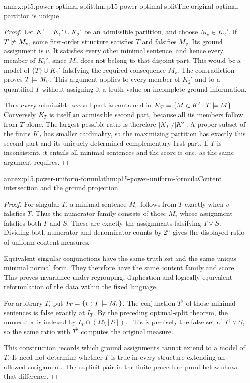 \begin{annexitem}{annex:p15.power-optimal-split}{thm:p15-power-optimal-split}{The original optimal partition is unique}
\begin{proof}
Let \(K'=K_1'\mathbin{\dot\cup}K_2'\)
be an admissible partition, and choose
\(M_v\in K_2'\).
If \(T\not\models M_v\), some
first-order structure satisfies
\(T\) and falsifies \(M_v\).
Its ground assignment is \(v\).
It satisfies every other minimal
sentence, and hence every member
of \(K_1'\), since \(M_v\) does
not belong to that disjoint part.
This would be a model of
\(\{T\}\cup K_1'\) falsifying the
required consequence \(M_v\).
The contradiction proves
\(T\models M_v\).
This argument applies to every
member of \(K_2'\) and to a
quantified \(T\) without assigning
it a truth value on incomplete
ground information.

Thus every admissible second
part is contained in
\(K_T=\{M\in K':T\models M\}\).
Conversely \(K_T\) is itself
an admissible second part,
because all its members follow
from \(T\) alone.
The largest possible ratio
is therefore \(|K_T|/|K'|\).
A proper subset of the finite
\(K_T\) has smaller cardinality,
so the maximizing partition
has exactly this second part
and its uniquely determined
complementary first part.
If \(T\) is inconsistent,
it entails all minimal
sentences and the score
is one, as the same argument
requires.
\end{proof}
\end{annexitem}

\begin{annexitem}{annex:p15.power-uniform-formula}{thm:p15-power-uniform-formula}{Content intersection and the ground projection}
\begin{proof}
For singular \(T\), a minimal sentence
\(M_v\) follows from \(T\) exactly
when \(v\) falsifies \(T\).
Thus the numerator family consists
of those \(M_v\) whose assignment
falsifies both \(T\) and \(S\).
These are exactly the assignments
falsifying \(T\lor S\).
Dividing both numerator and
denominator counts by \(2^n\)
gives the displayed ratio
of uniform content measures.

Equivalent singular conjunctions
have the same truth set and
the same unique minimal normal
form. They therefore have the
same content family and score.
This proves invariance under
regrouping, duplication and
logically equivalent reformulation
of the data within the fixed
language.

For arbitrary \(T\), put
\(I_T=\{v:T\models M_v\}\).
The conjunction \(T^\flat\)
of those minimal sentences
is false exactly at \(I_T\).
By the preceding optimal-split
theorem, the numerator is
indexed by \(I_T\cap(\Omega\setminus[S])\).
This is precisely the false
set of \(T^\flat\lor S\),
so the same ratio with
\(T^\flat\) computes the
original measure.

This construction records
which ground assignments
cannot extend to a model
of \(T\). It need not
determine whether \(T\)
is true in every structure
extending an allowed assignment.
The explicit pair in the
finite-procedure proof below
shows that difference.
\end{proof}
\end{annexitem}

